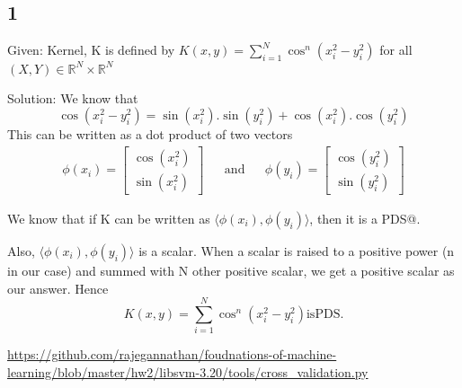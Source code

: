 \documentclass{article}
\begin{document}
\subsection*{1}
\begin{description}
  \item{Given:} Kernel, K is defined by \(K(x,y) = \sum_{i=1}^{N} \cos^{n} (x_{i}^{2} - y_{i}^{2} )\) for all \((X, Y) \in \mathbb{R}^{N} \times \mathbb{R}^{N} \) 
  \item{Solution:}  We know that
    \begin{equation}
      \cos (x_{i}^{2} - y_{i}^{2}) = \sin (x_{i}^{2}).\sin (y_{i}^{2}) + \cos (x_{i}^{2}).\cos (y_{i}^{2})
    \end{equation}
    This can be written as a dot product of two vectors 
    \begin{align}
    \phi(x_{i}) = \begin{bmatrix} \cos (x_{i}^{2}) \\ \sin (x_{i}^{2}) \end{bmatrix} && \mathrm{and} &&
    \phi(y_{i}) = \begin{bmatrix} \cos (y_{i}^{2}) \\ \sin (y_{i}^{2}) \end{bmatrix}
    \end{align}

    We know that if K can be written as \( \langle \phi(x_{i}), \phi(y_{i}) \rangle \), then it is a PDS@.

    Also, \( \langle \phi(x_{i}), \phi(y_{i}) \rangle \) is a scalar.  When a scalar is raised to a positive power (n in our case) and summed with N other positive scalar, we get a positive scalar as our answer.  Hence
    \begin{equation*}
      K(x,y) = \sum_{i=1}^{N} \cos^{n} (x_{i}^{2} - y_{i}^{2} ) \mathrm{is PDS.}
    \end{equation*}
\end{description}

\begin{thebibliography}{1}
   \url{https://github.com/rajegannathan/foudnations-of-machine-learning/blob/master/hw2/libsvm-3.20/tools/cross_validation.py}
\end{thebibliography}
\end{document}

